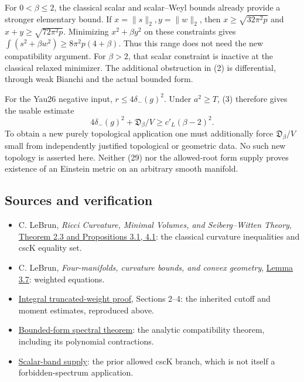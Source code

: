 \documentclass[
  10pt,
]{article}
\providecommand{\tightlist}{%
  \setlength{\itemsep}{0pt}\setlength{\parskip}{0pt}}
\begin{document}
For \(0<\beta\le2\), the classical scalar and scalar--Weyl bounds
already provide a stronger elementary bound. If \(x=\|s\|_2,y=\|w\|_2\),
then \(x\ge\sqrt{32\pi^2p}\) and \(x+y\ge\sqrt{72\pi^2p}\). Minimizing
\(x^2+\beta y^2\) on these constraints gives
\(\int(s^2+\beta w^2) \ge8\pi^2p(4+\beta)\). Thus this range does not
need the new compatibility argument. For \(\beta>2\), that scalar
constraint is inactive at the classical relaxed minimizer. The
additional obstruction in (2) is differential, through weak Bianchi and
the actual bounded form.

For the Yau26 negative input, \(r\le4\delta_-(g)^2\). Under
\(a^2\ge T\), (3) therefore gives the usable estimate \[
4\delta_-(g)^2+\mathfrak D_\beta/V
\ge c'_L(\beta-2)^2.
\tag{29}
\] To obtain a new purely topological application one must additionally
force \(\mathfrak D_\beta/V\) small from independently justified
topological or geometric data. No such new topology is asserted here.
Neither (29) nor the allowed-root form supply proves existence of an
Einstein metric on an arbitrary smooth manifold.

\hypertarget{sources-and-verification}{%
\subsection{Sources and verification}\label{sources-and-verification}}

\begin{itemize}
\tightlist
\item
  C. LeBrun, \emph{Ricci Curvature, Minimal Volumes, and Seiberg--Witten
  Theory}, \href{https://arxiv.org/abs/math/0003068}{Theorem 2.3 and
  Propositions 3.1, 4.1}: the classical curvature inequalities and cscK
  equality set.
\item
  C. LeBrun, \emph{Four-manifolds, curvature bounds, and convex
  geometry}, \href{https://arxiv.org/abs/math/0611450}{Lemma 3.7}:
  weighted equations.
\item
  \href{round4_rigidity.md}{Integral truncated-weight proof}, Sections
  2--4: the inherited cutoff and moment estimates, reproduced above.
\item
  \href{round21_analytic.md}{Bounded-form spectral theorem}: the
  analytic compatibility theorem, including its polynomial contractions.
\item
  \href{line1_scalar_band_remainder.md}{Scalar-band supply}: the prior
  allowed cscK branch, which is not itself a forbidden-spectrum
  application.
\end{itemize}
\end{document}
